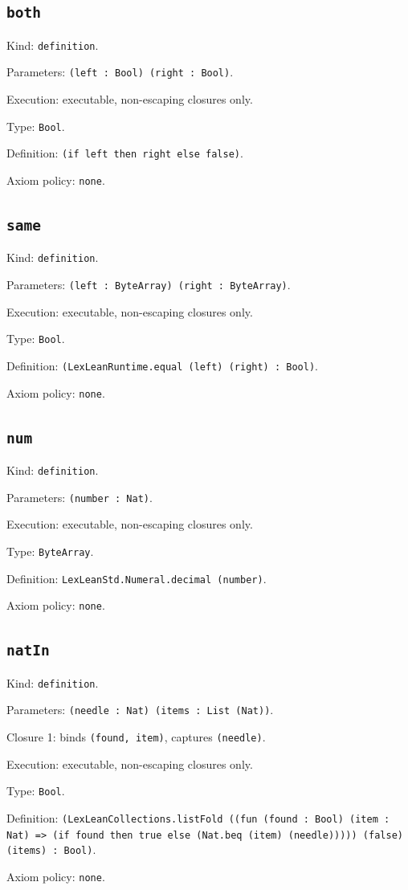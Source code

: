 \documentclass[11pt]{article}
\begin{document}
\subsection*{\texttt{both}}
\noindent Kind: \texttt{definition}.\par
\noindent Parameters: \texttt{(left : Bool) (right : Bool)}.\par
\noindent Execution: executable, non-escaping closures only.\par
\noindent Type: \texttt{Bool}.\par
\noindent Definition: \texttt{(if left then right else false)}.\par
\noindent Axiom policy: \texttt{none}.\par
\subsection*{\texttt{same}}
\noindent Kind: \texttt{definition}.\par
\noindent Parameters: \texttt{(left : ByteArray) (right : ByteArray)}.\par
\noindent Execution: executable, non-escaping closures only.\par
\noindent Type: \texttt{Bool}.\par
\noindent Definition: \texttt{(LexLeanRuntime.equal (left) (right) : Bool)}.\par
\noindent Axiom policy: \texttt{none}.\par
\subsection*{\texttt{num}}
\noindent Kind: \texttt{definition}.\par
\noindent Parameters: \texttt{(number : Nat)}.\par
\noindent Execution: executable, non-escaping closures only.\par
\noindent Type: \texttt{ByteArray}.\par
\noindent Definition: \texttt{LexLeanStd.Numeral.decimal (number)}.\par
\noindent Axiom policy: \texttt{none}.\par
\subsection*{\texttt{natIn}}
\noindent Kind: \texttt{definition}.\par
\noindent Parameters: \texttt{(needle : Nat) (items : List (Nat))}.\par
\noindent Closure 1: binds \texttt{(found, item)}, captures \texttt{(needle)}.\par
\noindent Execution: executable, non-escaping closures only.\par
\noindent Type: \texttt{Bool}.\par
\noindent Definition: \texttt{(LexLeanCollections.listFold ((fun (found : Bool) (item : Nat) => (if found then true else (Nat.beq (item) (needle))))) (false) (items) : Bool)}.\par
\noindent Axiom policy: \texttt{none}.\par
\end{document}
